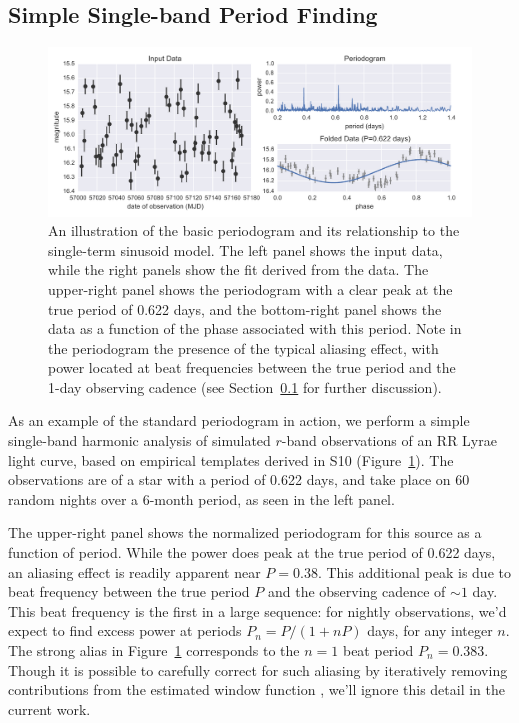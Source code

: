 \documentclass{emulateapj}
\newcommand{\Fig}[1]{Figure~\ref{fig:#1}}
\newcommand{\fig}[1]{\Fig{#1}}
\newcommand{\figlabel}[1]{\label{fig:#1}}
\newcommand{\Sect}[1]{Section~\ref{sect:#1}}
\newcommand{\sect}[1]{\Sect{#1}}
\newcommand{\sectlabel}[1]{\label{sect:#1}}
\begin{document}
\subsection{Simple Single-band Period Finding}
\sectlabel{simple_period}

\begin{figure}
  \centering
  \includegraphics[width=\textwidth]{fig01.pdf}
  \caption{
    An illustration of the basic periodogram and its relationship to the single-term sinusoid model. The left panel shows the input data, while the right panels show the fit derived from the data. The upper-right panel shows the periodogram with a clear peak at the true period of 0.622 days, and the bottom-right panel shows the data as a function of the phase associated with this period. Note in the periodogram the presence of the typical aliasing effect, with power located at beat frequencies between the true period and the 1-day observing cadence (see \sect{simple_period} for further discussion).
  }
  \figlabel{basic_example}
\end{figure}

As an example of the standard periodogram in action, we perform a simple single-band harmonic analysis of simulated $r$-band observations of an RR Lyrae light curve, based on empirical templates derived in S10 (\fig{basic_example}). The observations are of a star with a period of 0.622 days, and take place on 60 random nights over a 6-month period, as seen in the left panel.

The upper-right panel shows the normalized periodogram for this source as a function of period. While the power does peak at the true period of 0.622 days, an aliasing effect is readily apparent near $P=0.38$. This additional peak is due to beat frequency between the true period $P$ and the observing cadence of $\sim 1$ day. This beat frequency is the first in a large sequence: for nightly observations, we'd expect to find excess power at periods $P_n = P / (1 + nP)$ days, for any integer $n$. The strong alias in \fig{basic_example} corresponds to the $n=1$ beat period $P_n=0.383$. Though it is possible to carefully correct for such aliasing by iteratively removing contributions from the estimated window function \citep[e.g.][]{Roberts87}, we'll ignore this detail in the current work.
\end{document}

